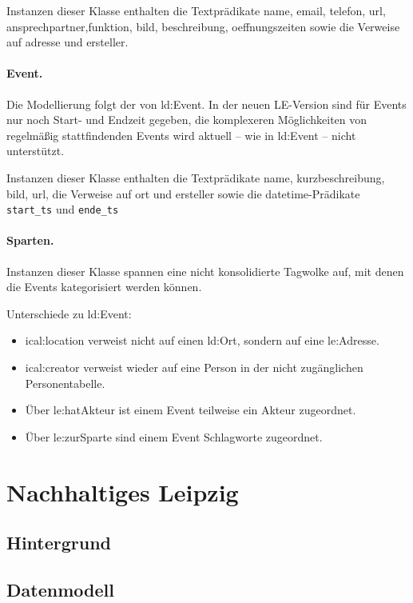 \documentclass[a4paper,11pt]{article}
\begin{document}
Instanzen dieser Klasse enthalten die Textprädikate name, email, telefon, url,
ansprechpartner,funktion, bild, beschreibung, oeffnungszeiten sowie die
Verweise auf adresse und ersteller. 

\paragraph{Event.}
Die Modellierung folgt der von ld:Event. In der neuen LE-Version sind für
Events nur noch Start- und Endzeit gegeben, die komplexeren Möglichkeiten von
regelmäßig stattfindenden Events wird aktuell -- wie in ld:Event -- nicht
unterstützt.  

Instanzen dieser Klasse enthalten die Textprädikate name, kurzbeschreibung,
bild, url, die Verweise auf ort und ersteller sowie die datetime-Prädikate
\texttt{start\_ts} und \texttt{ende\_ts}

\paragraph{Sparten.}
Instanzen dieser Klasse spannen eine nicht konsolidierte Tagwolke auf, mit
denen die Events kategorisiert werden können. 

Unterschiede zu ld:Event:
\begin{itemize}
\item ical:location verweist nicht auf einen ld:Ort, sondern auf eine
  le:Adresse.
\item ical:creator verweist wieder auf eine Person in der nicht zugänglichen
  Personentabelle.
\item Über le:hatAkteur ist einem Event teilweise ein Akteur zugeordnet.
\item Über le:zurSparte sind einem Event Schlagworte zugeordnet.
\end{itemize}


\section{Nachhaltiges Leipzig}
\subsection{Hintergrund}
\subsection{Datenmodell}
\end{document}
